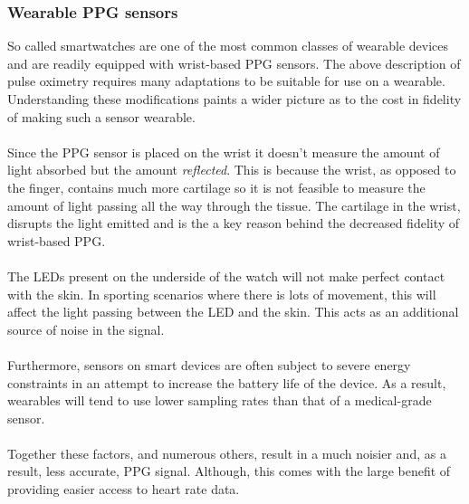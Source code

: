 \subsubsection{Wearable PPG sensors}
So called smartwatches are one of the most common classes of wearable devices and are readily equipped with wrist-based PPG sensors.
The above description of pulse oximetry requires many adaptations to be suitable for use on a wearable. Understanding these modifications paints a wider picture as to 
the cost in fidelity of making such a sensor wearable.
\\\\
Since the PPG sensor is placed on the wrist it doesn't measure the amount of light absorbed but the amount \textit{reflected}. This is because the wrist, as opposed to the finger, contains much more cartilage
so it is not feasible to measure the amount of light passing all the way through the tissue.
The cartilage in the wrist, disrupts the light emitted and is the a key reason behind the decreased fidelity of wrist-based PPG.
\\\\
The LEDs present on the underside of the watch will not make perfect contact with the skin. In sporting scenarios where there is lots of movement, this will affect the light passing between the LED and the skin. This acts as an additional source of noise in the signal.
\\\\
Furthermore, sensors on smart devices are often subject to severe energy constraints in an attempt to increase the battery life of the device.
As a result, wearables will tend to use lower sampling rates than that of a medical-grade sensor.
\\\\
Together these factors, and numerous others, result in a much noisier and, as a result, less accurate, PPG signal. 
Although, this comes with the large benefit of providing easier access to heart rate data.

